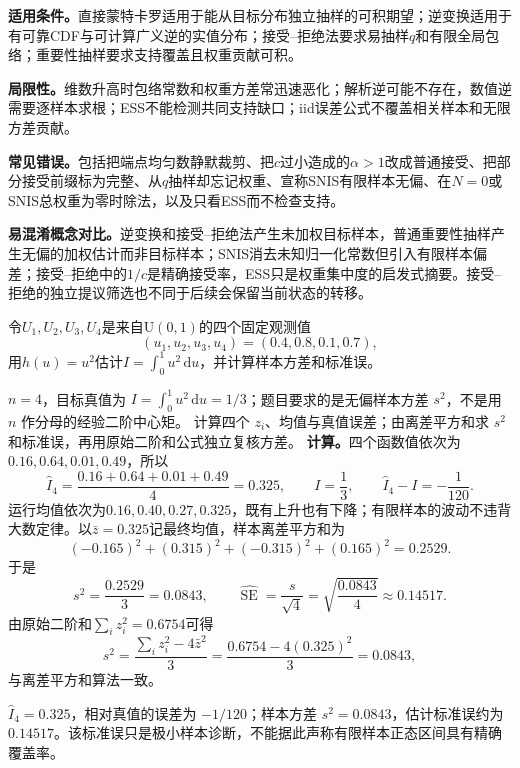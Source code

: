\label{struct:V5-C02-CH28}
\begin{applicabilitybox}
\textbf{适用条件。}直接蒙特卡罗适用于能从目标分布独立抽样的可积期望；逆变换适用于有可靠CDF与可计算广义逆的实值分布；接受--拒绝法要求易抽样$q$和有限全局包络；重要性抽样要求支持覆盖且权重贡献可积。

\label{struct:V5-C02-CH29}
\textbf{局限性。}维数升高时包络常数和权重方差常迅速恶化；解析逆可能不存在，数值逆需要逐样本求根；ESS不能检测共同支持缺口；iid误差公式不覆盖相关样本和无限方差贡献。

\label{struct:V5-C02-CH30}
\textbf{常见错误。}包括把端点均匀数静默裁剪、把$c$过小造成的$\alpha>1$改成普通接受、把部分接受前缀标为完整、从$q$抽样却忘记权重、宣称SNIS有限样本无偏、在$N=0$或SNIS总权重为零时除法，以及只看ESS而不检查支持。

\label{struct:V5-C02-CH31}
\textbf{易混淆概念对比。}逆变换和接受--拒绝法产生未加权目标样本，普通重要性抽样产生无偏的加权估计而非目标样本；SNIS消去未知归一化常数但引入有限样本偏差；接受--拒绝中的$1/c$是精确接受率，ESS只是权重集中度的启发式摘要。接受--拒绝的独立提议筛选也不同于后续会保留当前状态的\MetropolisHastings{}转移。
\end{applicabilitybox}

\label{struct:V5-C02-CH32}
\begin{example}[固定样本下的蒙特卡罗估计与误差审计]\label{exm:V5-C02-mc-audit}
令$U_1,U_2,U_3,U_4$是来自$\mathrm U(0,1)$的四个固定观测值
\[
(u_1,u_2,u_3,u_4)=(0.4,0.8,0.1,0.7),
\]
用$h(u)=u^2$估计$I=\int_0^1u^2\,\mathrm du$，并计算样本方差和标准误。
\end{example}

\label{struct:V5-C02-CH33}
\begin{solution}
\SolGiven $n=4$，目标真值为 $I=\int_0^1u^2\,\mathrm du=1/3$；题目要求的是无偏样本方差 $s^2$，不是用 $n$ 作分母的经验二阶中心矩。
\SolPlan 计算四个 $z_i$、均值与真值误差；由离差平方和求 $s^2$ 和标准误，再用原始二阶和公式独立复核方差。
\SolDerive
\textbf{计算。}四个函数值依次为$0.16,0.64,0.01,0.49$，所以
\[
\widehat I_4=\frac{0.16+0.64+0.01+0.49}{4}=0.325,
\qquad
I=\frac13,
\qquad
\widehat I_4-I=-\frac1{120}.
\]
运行均值依次为$0.16,0.40,0.27,0.325$，既有上升也有下降；有限样本的波动不违背大数定律。以$\bar z=0.325$记最终均值，样本离差平方和为
\[
(-0.165)^2+(0.315)^2+(-0.315)^2+(0.165)^2=0.2529.
\]
于是
\[
s^2=\frac{0.2529}{3}=0.0843,
\qquad
\widehat{\operatorname{SE}}=\frac{s}{\sqrt4}
=\sqrt{\frac{0.0843}{4}}\approx0.14517.
\]
\SolCheck 由原始二阶和$\sum_i z_i^2=0.6754$可得
\[
s^2=\frac{\sum_i z_i^2-4\bar z^2}{3}
=\frac{0.6754-4(0.325)^2}{3}=0.0843,
\]
与离差平方和算法一致。

\SolAnswer $\widehat I_4=0.325$，相对真值的误差为 $-1/120$；样本方差 $s^2=0.0843$，估计标准误约为 $0.14517$。该标准误只是极小样本诊断，不能据此声称有限样本正态区间具有精确覆盖率。
\end{solution}

